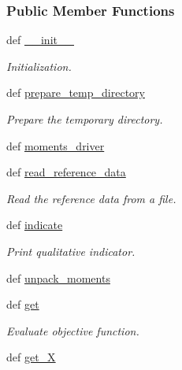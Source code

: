 \subsubsection*{\-Public \-Member \-Functions}
\begin{DoxyCompactItemize}
\item 
def \hyperlink{classforcebalance_1_1tinkerio_1_1Moments__TINKER_a55fdabe19222bb5804724a8f0d550547}{\-\_\-\-\_\-init\-\_\-\-\_\-}
\begin{DoxyCompactList}\small\item\em \-Initialization. \end{DoxyCompactList}\item 
def \hyperlink{classforcebalance_1_1tinkerio_1_1Moments__TINKER_a0bf6ca0f27dc603235af9df2faf3b5b6}{prepare\-\_\-temp\-\_\-directory}
\begin{DoxyCompactList}\small\item\em \-Prepare the temporary directory. \end{DoxyCompactList}\item 
def \hyperlink{classforcebalance_1_1tinkerio_1_1Moments__TINKER_a325347296dd2854942dd4319c65103be}{moments\-\_\-driver}
\item 
def \hyperlink{classforcebalance_1_1moments_1_1Moments_a2048e58340147becb826702f61442227}{read\-\_\-reference\-\_\-data}
\begin{DoxyCompactList}\small\item\em \-Read the reference data from a file. \end{DoxyCompactList}\item 
def \hyperlink{classforcebalance_1_1moments_1_1Moments_a2f51fa0fb20454ef3eb51b99e2ad103c}{indicate}
\begin{DoxyCompactList}\small\item\em \-Print qualitative indicator. \end{DoxyCompactList}\item 
def \hyperlink{classforcebalance_1_1moments_1_1Moments_a57f58da1365a48fbca1267e9f7228ab8}{unpack\-\_\-moments}
\item 
def \hyperlink{classforcebalance_1_1moments_1_1Moments_a488308fb94a59f876efecb115b2e60b3}{get}
\begin{DoxyCompactList}\small\item\em \-Evaluate objective function. \end{DoxyCompactList}\item 
def \hyperlink{classforcebalance_1_1target_1_1Target_a606dd136f195c267c05a2455405e5949}{get\-\_\-\-X}

\end{DoxyCompactItemize}
